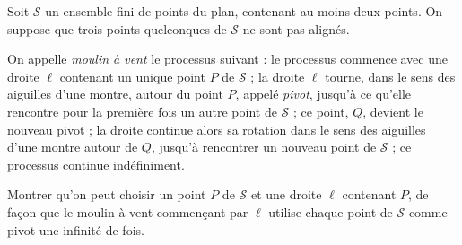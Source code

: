 Soit $\mathcal{S}$ un ensemble fini de points du plan, contenant au moins deux points. On suppose que trois
points quelconques de $\mathcal{S}$ ne sont pas alignés.

On appelle \emph{moulin à vent} le processus suivant : le processus commence avec une droite $\ell$ contenant
un unique point $P$ de $\mathcal{S}$ ; la droite $\ell$ tourne, dans le sens des aiguilles d'une montre, autour
du point $P$, appelé \emph{pivot}, jusqu'à ce qu'elle rencontre pour la première fois un autre point de
$\mathcal{S}$ ; ce point, $Q$, devient le nouveau pivot ; la droite continue alors sa rotation dans le sens des
aiguilles d'une montre autour de $Q$, jusqu'à rencontrer un nouveau point de $\mathcal{S}$ ; ce processus
continue indéfiniment.

Montrer qu'on peut choisir un point $P$ de $\mathcal{S}$ et une droite $\ell$ contenant $P$, de façon que le
moulin à vent commençant par $\ell$ utilise chaque point de $\mathcal{S}$ comme pivot une infinité de fois.
